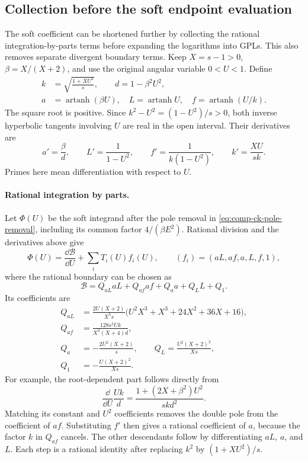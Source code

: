 \subsection{Collection before the soft endpoint evaluation}
The soft coefficient can be shortened further by collecting the rational
integration-by-parts terms before expanding the logarithms into GPLs.
This also removes separate divergent boundary terms. Keep $X=s-1>0$,
$\beta=X/(X+2)$, and use the original angular variable $0<U<1$.
Define
\begin{align}
 k&=\sqrt{\frac{1+XU^2}{s}},\qquad d=1-\beta^2U^2,\\
 a&=\operatorname{artanh}(\beta U),\quad
 L=\operatorname{artanh}U,\quad f=\operatorname{artanh}(U/k).
\end{align}
The square root is positive. Since $k^2-U^2=(1-U^2)/s>0$, both
inverse hyperbolic tangents involving $U$ are real in the open interval.
Their derivatives are
\begin{equation}
 a'=\frac{\beta}{d},\qquad L'=\frac1{1-U^2},\qquad
 f'=\frac1{k(1-U^2)},\qquad k'=\frac{XU}{sk}.
\end{equation}
Primes here mean differentiation with respect to $U$.

\paragraph{Rational integration by parts.} Let $\Phi(U)$ be the soft
integrand after the pole removal in
\eqref{eq:comp-ck-pole-removal}, including its common factor
$4/(\beta E^2)$. Rational division and the derivatives above give
\begin{equation}
 \Phi(U)=\frac{\dd\mathcal B}{\dd U}+\sum_i T_i(U)f_i(U),
 \qquad (f_i)=(aL,af,a,L,f,1),
\end{equation}
where the rational boundary can be chosen as
\begin{equation}
 \mathcal B=Q_{aL}aL+Q_{af}af+Q_a a+Q_L L+Q_1.
\end{equation}
Its coefficients are
\begin{align}
 Q_{aL}&=\frac{2U(X+2)}{X^3s}
       \bigl(U^2X^3+X^3+24X^2+36X+16\bigr),\\
 Q_{af}&=\frac{128s^2Uk}{X^3(X+4)d},\\
 Q_a&=-\frac{2U^2(X+2)}s,\qquad
 Q_L=\frac{U^2(X+2)^2}{Xs},\\
 Q_1&=-\frac{U(X+2)^2}{Xs}.
\end{align}
For example, the root-dependent part follows directly from
\begin{equation}
 \frac{\dd}{\dd U}\frac{Uk}{d}
 =\frac{1+(2X+\beta^2)U^2}{skd^2}.
\end{equation}
Matching its constant and $U^2$ coefficients removes the double pole
from the coefficient of $af$. Substituting $f'$ then gives a rational
coefficient of $a$, because the factor $k$ in $Q_{af}$ cancels.
The other descendants follow by differentiating $aL$, $a$, and $L$.
Each step is a rational identity after replacing $k^2$ by
$(1+XU^2)/s$.

